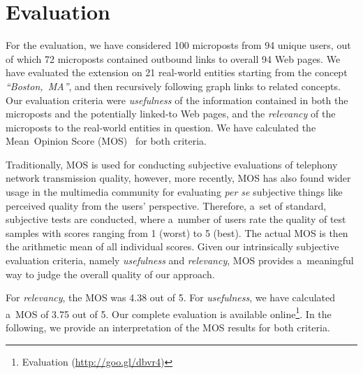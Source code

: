 \documentclass[runningheads,a4paper]{llncs}
\begin{document}
\section{Evaluation}
For the evaluation, we have considered 100 microposts from 94 unique users,
out of which 72 microposts contained outbound links to overall 94 Web pages.
We have evaluated the extension on 21 real-world entities starting from the concept
\emph{``Boston,~MA''}, and then recursively following graph links to related concepts.
Our evaluation criteria were \emph{usefulness} of the information
contained in both the microposts and the potentially linked-to Web pages,
and the \emph{relevancy} of the microposts to the real-world entities in question.
We have calculated the Mean~Opinion Score (MOS)~\cite{mos1998} for both criteria.

Traditionally, MOS is used for conducting subjective evaluations
of telephony network transmission quality,
however, more recently, MOS has also found wider usage in the multimedia community
for evaluating \emph{per se} subjective things
like perceived quality from the users' perspective. 
Therefore, a~set of standard, subjective tests are conducted,
where a~number of users rate the quality of test samples
with scores ranging from 1 (worst) to 5 (best).
The actual MOS is then the arithmetic mean of all individual scores.
Given our intrinsically subjective evaluation criteria,
namely \emph{usefulness} and \emph{relevancy},
MOS provides a~meaningful way to judge the overall quality of our approach.

For \emph{relevancy}, the MOS was 4.38 out of 5.
For \emph{usefulness}, we have calculated a~MOS of 3.75 out of 5.
Our complete evaluation is available online\footnote{Evaluation (\url{http://goo.gl/dbvr4})}.
In the following, we provide an interpretation of the MOS results for both criteria.
\end{document}
